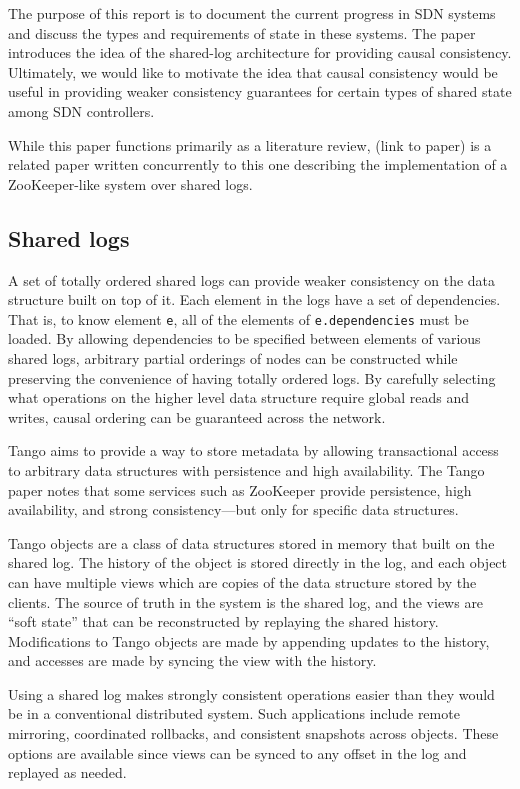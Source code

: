 \documentclass[letterpaper,twocolumn,10pt]{article}
\begin{document}
The purpose of this report is to document the current progress in SDN systems and discuss the types and requirements of state in these systems. The paper introduces the idea of the shared-log architecture for providing causal consistency. Ultimately, we would like to motivate the idea that causal consistency would be useful in providing weaker consistency guarantees for certain types of shared state among SDN controllers.

While this paper functions primarily as a literature review, (link to paper) is a related paper written concurrently to this one describing the implementation of a ZooKeeper-like system over shared logs.

\subsection{Shared logs}

A set of totally ordered shared logs can provide weaker consistency on the data structure built on top of it. Each element in the logs have a set of dependencies. That is, to know element \verb_e_, all of the elements of \verb_e.dependencies_ must be loaded.  By allowing dependencies to be specified between elements of various shared logs, arbitrary partial orderings of nodes can be constructed while preserving the convenience of having totally ordered logs. By carefully selecting what operations on the higher level data structure require global reads and writes, causal ordering can be guaranteed across the network.

Tango \cite{Tango} aims to provide a way to store metadata by allowing transactional access to arbitrary data structures with persistence and high availability. The Tango paper notes that some services such as ZooKeeper \cite{hunt2010zookeeper} provide persistence, high availability, and strong consistency---but only for specific data structures.

Tango objects are a class of data structures stored in memory that built on the shared log. The history of the object is stored directly in the log, and each object can have multiple views which are copies of the data structure stored by the clients. The source of truth in the system is the shared log, and the views are ``soft state'' that can be reconstructed by replaying the shared history. Modifications to Tango objects are made by appending updates to the history, and accesses are made by syncing the view with the history.

Using a shared log makes strongly consistent operations easier than they would be in a conventional distributed system. Such applications include remote mirroring, coordinated rollbacks, and consistent snapshots across objects. These options are available since views can be synced to any offset in the log and replayed as needed.
\end{document}
